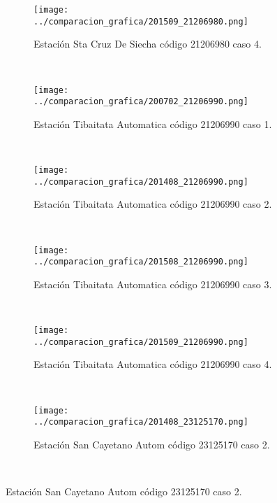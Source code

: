 \begin{figure}[H]\ContinuedFloat
\centering
\begin{subfigure}[normla]{0.4\textwidth}
\caption{Estación Sta Cruz De Siecha código 21206980 caso 4.}
\texttt{[image: ../comparacion\_grafica/201509\_21206980.png]}
\end{subfigure}
~
\begin{subfigure}[normla]{0.4\textwidth}
\caption{Estación Tibaitata Automatica código 21206990 caso 1.}
\texttt{[image: ../comparacion\_grafica/200702\_21206990.png]}
\end{subfigure}
~
\begin{subfigure}[normla]{0.4\textwidth}
\caption{Estación Tibaitata Automatica código 21206990 caso 2.}
\texttt{[image: ../comparacion\_grafica/201408\_21206990.png]}
\end{subfigure}
~
\begin{subfigure}[normla]{0.4\textwidth}
\caption{Estación Tibaitata Automatica código 21206990 caso 3.}
\texttt{[image: ../comparacion\_grafica/201508\_21206990.png]}
\end{subfigure}
~
\begin{subfigure}[normla]{0.4\textwidth}
\caption{Estación Tibaitata Automatica código 21206990 caso 4.}
\texttt{[image: ../comparacion\_grafica/201509\_21206990.png]}
\end{subfigure}
~
\begin{subfigure}[normla]{0.4\textwidth}
\caption{Estación San Cayetano Autom  código 23125170 caso 2.}
\texttt{[image: ../comparacion\_grafica/201408\_23125170.png]}
\end{subfigure}
~
\end{figure}
           
